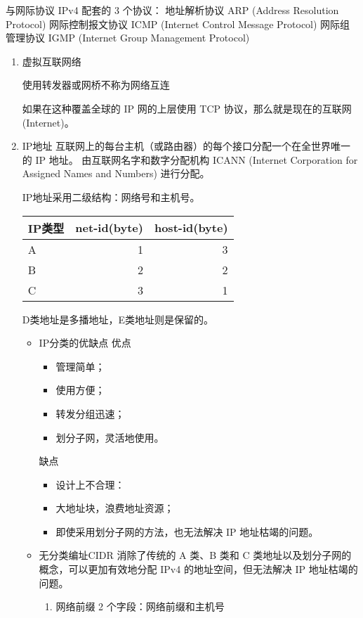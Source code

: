\documentclass[11pt]{article}
\begin{document}
与网际协议 IPv4 配套的 3 个协议：
地址解析协议 ARP (Address Resolution Protocol)
网际控制报文协议 ICMP (Internet Control Message Protocol)
网际组管理协议 IGMP (Internet Group Management Protocol)
\begin{enumerate}
\item 虚拟互联网络
\label{sec:org592f689}

使用转发器或网桥不称为网络互连

如果在这种覆盖全球的 IP 网的上层使用 TCP 协议，那么就是现在的互联网 (Internet)。
\item IP地址
\label{sec:org97afdd2}
互联网上的每台主机（或路由器）的每个接口分配一个在全世界唯一的 IP 地址。
由互联网名字和数字分配机构 ICANN (Internet Corporation for Assigned Names and Numbers) 进行分配。 

IP地址采用二级结构：网络号和主机号。

\begin{center}
\begin{tabular}{lrr}
IP类型 & net-id(byte) & host-id(byte)\\
\hline
A & 1 & 3\\
B & 2 & 2\\
C & 3 & 1\\
\end{tabular}
\end{center}

D类地址是多播地址，E类地址则是保留的。

\begin{itemize}
\item IP分类的优缺点
优点
\begin{itemize}
\item 管理简单；
\item 使用方便；
\item 转发分组迅速；
\item 划分子网，灵活地使用。
\end{itemize}
缺点
\begin{itemize}
\item 设计上不合理：
\item 大地址块，浪费地址资源；
\item 即使采用划分子网的方法，也无法解决 IP 地址枯竭的问题。
\end{itemize}

\item 无分类编址CIDR
消除了传统的 A 类、B 类和 C 类地址以及划分子网的概念，可以更加有效地分配 IPv4 的地址空间，但无法解决 IP 地址枯竭的问题。

\begin{enumerate}
\item 网络前缀
2 个字段：网络前缀和主机号


\end{enumerate}
\end{itemize}
\end{enumerate}
\end{document}

